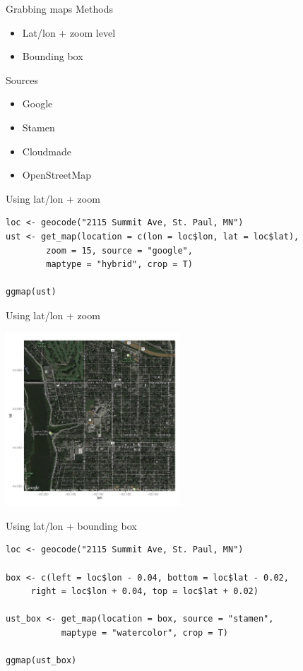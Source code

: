 \documentclass[sans,aspectratio=169,presentation,bigger,fleqn]{beamer}
\begin{document}
\begin{frame}[label=sec-3]{Grabbing maps}
Methods
\begin{itemize}
\item Lat/lon + zoom level
\item Bounding box
\end{itemize}

Sources
\begin{itemize}
\item Google
\item Stamen
\item Cloudmade
\item OpenStreetMap
\end{itemize}
\end{frame}
\begin{frame}[fragile,label=sec-4]{Using lat/lon + zoom}
 \begin{verbatim}
loc <- geocode("2115 Summit Ave, St. Paul, MN")
ust <- get_map(location = c(lon = loc$lon, lat = loc$lat),
		zoom = 15, source = "google",
		maptype = "hybrid", crop = T)

ggmap(ust)
\end{verbatim}
\end{frame}
\begin{frame}[label=sec-5]{Using lat/lon + zoom}
\begin{center}
\includegraphics[height=6.5cm]{./img/ust-coords-zoom.pdf}
\end{center}
\end{frame}
\begin{frame}[fragile,label=sec-6]{Using lat/lon + bounding box}
 \begin{verbatim}
loc <- geocode("2115 Summit Ave, St. Paul, MN")

box <- c(left = loc$lon - 0.04, bottom = loc$lat - 0.02,
	 right = loc$lon + 0.04, top = loc$lat + 0.02)

ust_box <- get_map(location = box, source = "stamen",
		   maptype = "watercolor", crop = T)

ggmap(ust_box)
\end{verbatim}
\end{frame}
\end{document}
